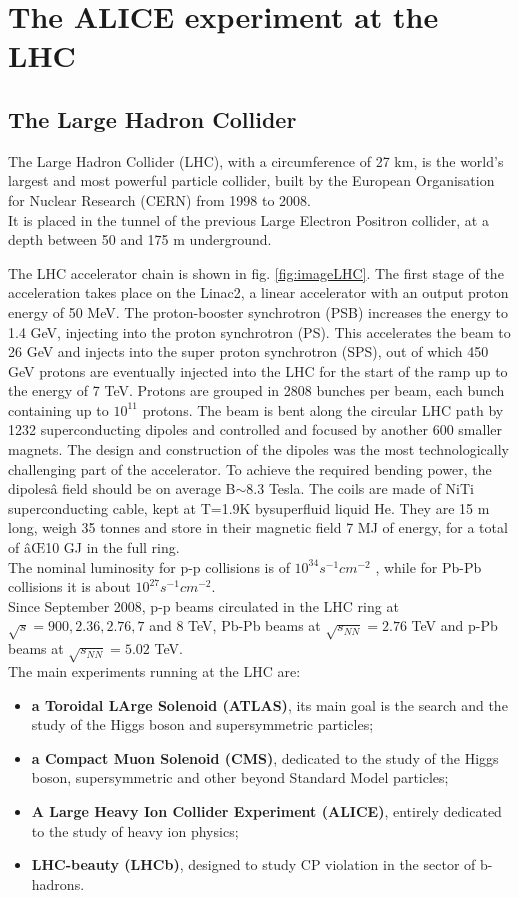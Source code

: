 \chapter{The ALICE experiment at the LHC}


\section{The Large Hadron Collider}
The Large Hadron Collider (LHC), with a circumference of 27 km, is the world's largest and most powerful particle collider, built by the European Organisation for Nuclear Research (CERN) from 1998 to 2008. \\It is placed in the tunnel of the previous Large Electron Positron collider, at a depth between 50 and 175 m underground.

The LHC accelerator chain is shown in fig. \ref{fig:imageLHC}. The first stage of the acceleration takes place on the Linac2, a linear accelerator with an output proton energy of 50 MeV. The proton-booster synchrotron (PSB) increases the energy to 1.4 GeV, injecting into the proton synchrotron (PS). This accelerates the beam to 26 GeV and injects into the super proton synchrotron (SPS), out of which 450 GeV protons are eventually injected into the LHC for the start of the ramp up to the energy of 7 TeV. Protons are grouped in 2808 bunches per beam, each bunch containing up to $10^{11}$ protons. The beam is bent along the circular LHC path by 1232 superconducting dipoles and controlled and focused by another 600 smaller magnets. The design and construction of the dipoles was the most technologically challenging part of the accelerator. To achieve the required bending power, the dipolesâ field should be on average B$\sim$8.3 Tesla. The coils are made of NiTi superconducting cable, kept at T=1.9K bysuperfluid liquid He. They are 15 m long, weigh 35 tonnes and store in their magnetic field 7 MJ of energy, for a total of âŒ10 GJ in the full ring.\\
The nominal luminosity for p-p collisions is of $10^{34} s^{-1} cm^{-2}$ , while for Pb-Pb collisions it is about $10^{27} s^{-1} cm^{-2}$. \\Since September 2008, p-p beams circulated in the LHC ring at $\sqrt{s}=900, 2.36, 2.76, 7$ and 8 TeV, Pb-Pb beams at $\sqrt{s_{NN}}=2.76$ TeV and p-Pb beams at $\sqrt{s_{NN}}=5.02$ TeV.
\\
The main experiments running at the LHC are:
\begin{itemize}
\item \textbf{a Toroidal LArge Solenoid (ATLAS)}, its main goal is the search and the study of the Higgs boson and supersymmetric particles; 
\item \textbf{a Compact Muon Solenoid (CMS)}, dedicated to the study of the Higgs boson, supersymmetric and other beyond Standard Model particles;
\item \textbf{A Large Heavy Ion Collider Experiment (ALICE)}, entirely dedicated to the study of heavy ion physics;
\item \textbf{LHC-beauty (LHCb)}, designed to study CP violation in the sector of b-hadrons.
\end{itemize}
